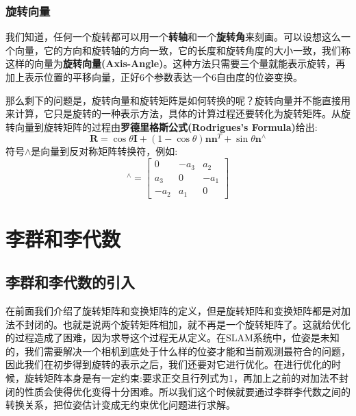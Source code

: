 \subsubsection{旋转向量}
我们知道，任何一个旋转都可以用一个\textbf{转轴}和一个\textbf{旋转角}来刻画。可以设想这么一个向量，它的方向和旋转轴的方向一致，它的长度和旋转角度的大小一致，我们称这样的向量为\textbf{旋转向量(Axis-Angle)}。这种方法只需要三个量就能表示旋转，再加上表示位置的平移向量，正好6个参数表达一个6自由度的位姿变换。\par
那么剩下的问题是，旋转向量和旋转矩阵是如何转换的呢？旋转向量并不能直接用来计算，它只是旋转的一种表示方法，具体的计算过程还要转化为旋转矩阵。从旋转向量到旋转矩阵的过程由\textbf{罗德里格斯公式(Rodrigues's Formula)}给出:
\begin{equation}
\boldsymbol{R}=\cos \theta \boldsymbol{I}+(1-\cos \theta) \boldsymbol{n} \boldsymbol{n}^{T}+\sin \theta \boldsymbol{n}^{\wedge}\label{rodrigues}
\end{equation}
符号$\wedge$是向量到反对称矩阵转换符，例如:
\begin{equation}
	[a_1,a_2,a_3]^\wedge = \begin{bmatrix}
	0 & -a_3 & a_2\\
	a_3& 0& -a_1\\
	-a_2& a_1& 0
	\end{bmatrix}\label{fanduichen}
\end{equation}

\section{李群和李代数}
\subsection{李群和李代数的引入}
在前面我们介绍了旋转矩阵和变换矩阵的定义，但是旋转矩阵和变换矩阵都是对加法不封闭的。也就是说两个旋转矩阵相加，就不再是一个旋转矩阵了。这就给优化的过程造成了困难，因为求导这个过程无从定义。在SLAM系统中，位姿是未知的，我们需要解决一个相机到底处于什么样的位姿才能和当前观测最符合的问题，因此我们在初步得到旋转的表示之后，我们还要对它进行优化。在进行优化的时候，旋转矩阵本身是有一定约束:要求正交且行列式为1，再加上之前的对加法不封闭的性质会使得优化变得十分困难。所以我们这个时候就要通过李群李代数之间的转换关系，把位姿估计变成无约束优化问题进行求解。

